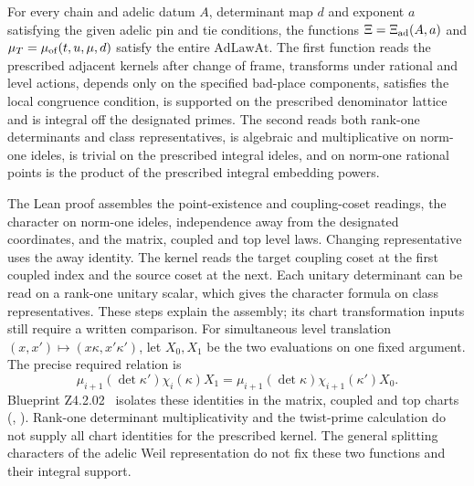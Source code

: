 
\begin{formalstatement}\label{pn:P090}
For every chain and adelic datum $A$, determinant map $d$ and exponent $a$ satisfying the given adelic pin and tie conditions, the functions $\Xi=\Xi_{\rm ad}(A,a)$ and $\mu_T=\mu_{\rm of}(t,u,\mu,d)$ satisfy the entire $\mathrm{AdLawAt}$. The first function reads the prescribed adjacent kernels after change of frame, transforms under rational and level actions, depends only on the specified bad-place components, satisfies the local congruence condition, is supported on the prescribed denominator lattice and is integral off the designated primes. The second reads both rank-one determinants and class representatives, is algebraic and multiplicative on norm-one ideles, is trivial on the prescribed integral ideles, and on norm-one rational points is the product of the prescribed integral embedding powers.
\end{formalstatement}


The Lean proof assembles the point-existence and coupling-coset readings, the character on norm-one ideles, independence away from the designated coordinates, and the matrix, coupled and top level laws. Changing representative uses the away identity. The kernel reads the target coupling coset at the first coupled index and the source coset at the next. Each unitary determinant can be read on a rank-one unitary scalar, which gives the character formula on class representatives. These steps explain the assembly; its chart transformation inputs still require a written comparison. For simultaneous level translation $(x,x')\mapsto(x\kappa,x'\kappa')$, let $X_0,X_1$ be the two evaluations on one fixed argument. The precise required relation is
\[
 \mu_{i+1}(\det\kappa')\chi_i(\kappa)X_1
  =\mu_{i+1}(\det\kappa)\chi_{i+1}(\kappa')X_0 .
\]
Blueprint Z4.2.02~ isolates these identities in the matrix, coupled and top charts (, ). Rank-one determinant multiplicativity and the twist-prime calculation do not supply all chart identities for the prescribed kernel. The general splitting characters of the adelic Weil representation do not fix these two functions and their integral support.

